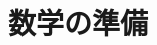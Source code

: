 \documentclass[10pt,dvipdfmx]{jsbook}
\begin{document}
\pagestyle{empty}

%

\chapter{数学の準備}

\end{document}
